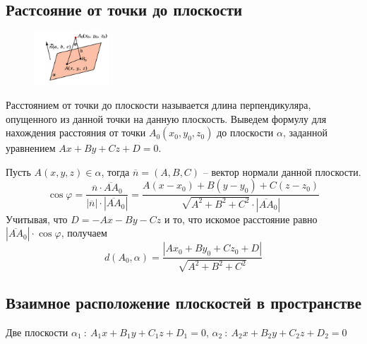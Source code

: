 \documentclass{article}
\begin{document}
\subsection{Растсояние от точки до плоскости}
\begin{figure}
    \centering
    \includegraphics[width=0.25\textwidth]{pic5.png}
\end{figure}
Расстоянием от точки до плоскости называется длина перпендикуляра, опущенного из данной точки на данную плоскость. Выведем формулу для нахождения расстояния от точки $A_0(x_0,y_0,z_0)$ до плоскости $\alpha$, заданной уравнением $Ax+By+Cz+D=0$.

Пусть $A(x,y,z)\in\alpha$, тогда $\overline{n}=(A,B,C)$ -- вектор нормали данной плоскости.
$$ \cos\varphi=\frac{\overline{n}\cdot\overline{AA}_0}{|\overline{n}|\cdot|\overline{AA}_0|}=\frac{A(x-x_0)+B(y-y_0)+C(z-z_0)}{\sqrt{A^2+B^2+C^2}\cdot|\overline{AA}_0|} $$
Учитывая, что $D=-Ax-By-Cz$ и то, что искомое расстояние равно $|\overline{AA}_0|\cdot\cos\varphi$, получаем
$$ d(A_0,\alpha)=\frac{|Ax_0+By_0+Cz_0+D|}{\sqrt{A^2+B^2+C^2}} $$
\subsection{Взаимное расположение плоскостей в пространстве}
Две плоскости $\alpha_1\::\:A_1x+B_1y+C_1z+D_1=0,\,\alpha_2\::\:A_2x+B_2y+C_2z+D_2=0$
\end{document}
